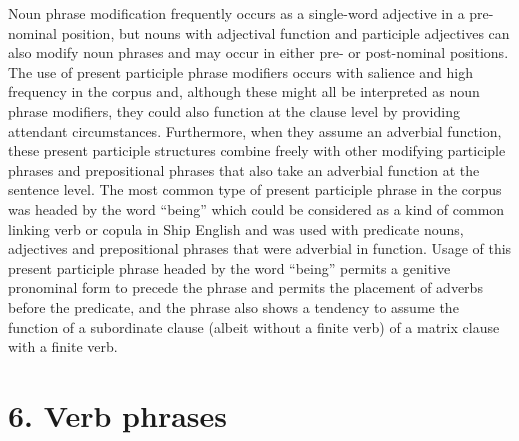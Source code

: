 Noun phrase modification frequently occurs as a single-word adjective in a pre-nominal position, but nouns with adjectival function and participle adjectives can also modify noun phrases and may occur in either pre- or post-nominal positions. The use of present participle phrase modifiers occurs with salience and high frequency in the corpus and, although these might all be interpreted as noun phrase modifiers, they could also function at the clause level by providing attendant circumstances. Furthermore, when they assume an adverbial function, these present participle structures combine freely with other modifying participle phrases and prepositional phrases that also take an adverbial function at the sentence level. The most common type of present participle phrase in the corpus was headed by the word “being” which could be considered as a kind of common linking verb or copula in Ship English and was used with predicate nouns, adjectives and prepositional phrases that were adverbial in function. Usage of this present participle phrase headed by the word “being” permits a genitive pronominal form to precede the phrase and permits the placement of adverbs before the predicate, and the phrase also shows a tendency to assume the function of a subordinate clause (albeit without a finite verb) of a matrix clause with a finite verb. 

\chapter{\textbf{6.} \textbf{Verb} \textbf{phrases}}

